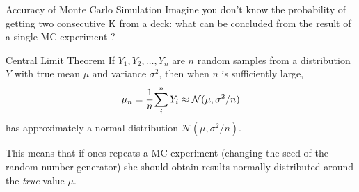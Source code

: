 \documentclass{beamer}
\begin{document}
\begin{frame}{Accuracy of Monte Carlo Simulation}
Imagine you don't know the probability of getting two consecutive K from a deck: what can be concluded from the result of a single MC experiment ?
\begin{block}{Central Limit Theorem}    
If $Y_1, Y_2,\dots, Y_n$ are $n$ random samples from a distribution $Y$ with true mean $\mu$ and variance $\sigma^{2}$, then when $n$ is sufficiently large, 
\begin{equation*}
\mu_n = \cfrac{1}{n}\sum_i^n Y_i \approx \mathcal{N}(\mu, \sigma^2/n)
\end{equation*}
has approximately a normal distribution $\mathcal{N}(\mu, \sigma^2/n)$. 

This means that if ones repeats a MC experiment (changing the seed of the random number generator) she should obtain results normally distributed around the \emph{true} value $\mu$.
\end{block}
\href{https://colab.research.google.com/drive/1cQbX7jWk4_pfrm72r3ZiZyDEpevP63z2?authuser=1\#scrollTo=0ef8c284\&line=7\&uniqifier=1}{}
\end{frame}
\end{document}
